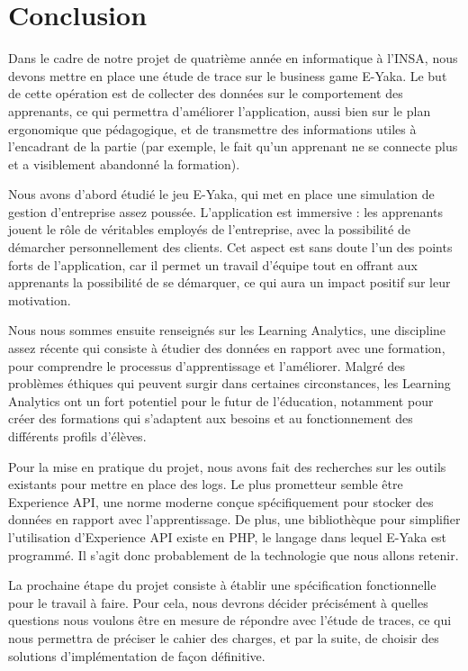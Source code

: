 \chapter*{Conclusion}

Dans le cadre de notre projet de quatrième année en informatique à l'INSA, nous devons mettre en place une étude de trace sur le business game E-Yaka. Le but de cette opération est de collecter des données sur le comportement des apprenants, ce qui permettra d'améliorer l'application, aussi bien sur le plan ergonomique que pédagogique, et de transmettre des informations utiles à l'encadrant de la partie (par exemple, le fait qu'un apprenant ne se connecte plus et a visiblement abandonné la formation).


Nous avons d'abord étudié le jeu E-Yaka, qui met en place une simulation de gestion d'entreprise assez poussée. L'application est immersive : les apprenants jouent le rôle de véritables employés de l'entreprise, avec la possibilité de démarcher personnellement des clients. Cet aspect est sans doute l'un des points forts de l'application, car il permet un travail d'équipe tout en offrant aux apprenants la possibilité de se démarquer, ce qui aura un impact positif sur leur motivation.


Nous nous sommes ensuite renseignés sur les Learning Analytics, une discipline assez récente qui consiste à étudier des données en rapport avec une formation, pour comprendre le processus d'apprentissage et l'améliorer. Malgré des problèmes éthiques qui peuvent surgir dans certaines circonstances, les Learning Analytics ont un fort potentiel pour le futur de l'éducation, notamment pour créer des formations qui s'adaptent aux besoins et au fonctionnement des différents profils d'élèves.


Pour la mise en pratique du projet, nous avons fait des recherches sur les outils existants pour mettre en place des logs. Le plus prometteur semble être Experience API, une norme moderne conçue spécifiquement pour stocker des données en rapport avec l'apprentissage. De plus, une bibliothèque pour simplifier l'utilisation d'Experience API existe en PHP, le langage dans lequel E-Yaka est programmé. Il s'agit donc probablement de la technologie que nous allons retenir.


La prochaine étape du projet consiste à établir une spécification fonctionnelle pour le travail à faire. Pour cela, nous devrons décider précisément à quelles questions nous voulons être en mesure de répondre avec l'étude de traces, ce qui nous permettra de préciser le cahier des charges, et par la suite, de choisir des solutions d'implémentation de façon définitive.
